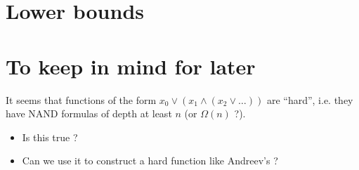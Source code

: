 \documentclass{article}
\theoremstyle{plain}
\theoremstyle{definition}
\begin{document}
\section{Lower bounds}



\section{To keep in mind for later}
It seems that functions of the form $x_0 \vee (x_1 \wedge (x_2 \vee \ldots))$
are ``hard'', i.e. they have NAND formulas of depth at least $n$ (or $\Omega(n)$ ?).

\begin{itemize}
	\item Is this true ?
	\item Can we use it to construct a hard function like Andreev's ?
\end{itemize}
\end{document}
